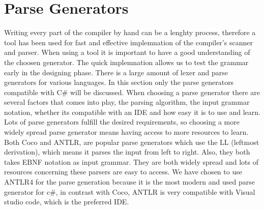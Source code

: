 \section{Parse Generators}
Writing every part of the compiler by hand can be a lenghty process, therefore a tool has been used for fast and effective implemnation of the compiler's scanner and parser. When using a tool it is important to have a good understanding of the choosen generator. The quick implemnation allows us to test the grammar early in the designing phase.
There is a large amount of lexer and parse generators for various languages. In this section only the parse generators compatible with C# 
will be discussed. When choosing a parse generator there are several factors that comes into play, the parsing algorithm, the input grammar notation,
whether its compatible with an IDE and how easy it is to use and learn. Lots of parse generators fulfill the desired requirements, 
so choosing a more widely spread parse generator means having access to more resources to learn. Both Coco and ANTLR, are popular parse generators which use the LL (leftmost derivation), which means it parses the input from left to right. 
Also, they both takes EBNF notation as input grammar. They are both widely spread and lots of resources concerning these parsers are easy to access. \newline
We have chosen to use ANTLR4 for the parse generation because it is the most modern and used parse generator for c#, in contrast with Coco, ANTLR is very compatible with Visual studio code, which is the preferred IDE. 
